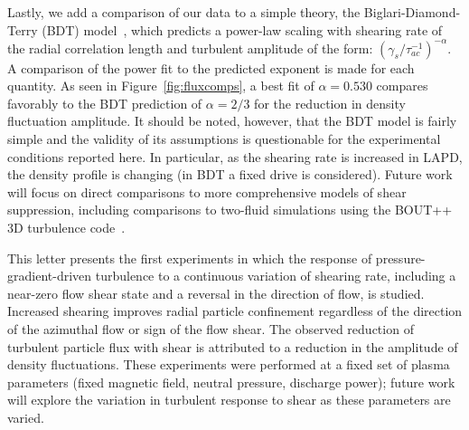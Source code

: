 \documentclass[aps,prl,amsmath,amssymb,reprint,superscriptaddress]{revtex4-1} %
\begin{document}

Lastly, we add a comparison of our data to a simple theory, the
Biglari-Diamond-Terry (BDT) model~\cite{biglari90}, which predicts a
power-law scaling with shearing rate of the radial correlation length and turbulent
amplitude of the form: $\left(\gamma_{s}/\tau_{ac}^{-1}\right)^{-\alpha}$. A comparison of the power fit to the
predicted exponent is made for each quantity. As seen in
Figure~\ref{fig:fluxcomps}, a best fit of $\alpha = 0.530$ compares
favorably to the BDT prediction of $\alpha = 2/3$ for the reduction in
density fluctuation amplitude. 
It should be noted, however, that the
BDT model is fairly simple and the validity of its assumptions is
questionable for the experimental conditions reported here.  In
particular, as the shearing rate is increased in LAPD, the density
profile is changing (in BDT a fixed drive is considered).  Future work
will focus on direct comparisons to more comprehensive models of shear
suppression, including comparisons to two-fluid simulations using the
BOUT++ 3D turbulence code~\cite{umansky11}.  

This letter presents the first experiments in which the response of
pressure-gradient-driven turbulence to a continuous
variation of shearing rate, including a near-zero flow shear state and
a reversal in the direction of flow, is studied.  Increased shearing
improves radial particle confinement regardless of the direction of
the azimuthal flow or sign of the flow shear. The observed reduction of
turbulent particle flux with shear is attributed to a reduction in the
amplitude of density fluctuations. These
experiments were performed at a fixed set of plasma parameters (fixed
magnetic field, neutral pressure, discharge power); future work will
explore the variation in turbulent response to shear as these
parameters are varied.  

%
\end{document}
